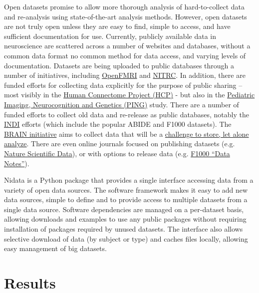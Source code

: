 \documentclass[twocolumn]{bmcart}%
\begin{document}
Open datasets promise to allow more thorough analysis of hard-to-collect
data and re-analysis using state-of-the-art analysis methods. However,
open datasets are not truly open unless they are easy to find, simple to
access, and have sufficient documentation for use. Currently, publicly
available data in neuroscience are scattered across a number of websites
and databases, without a common data format no common method for data
access, and varying levels of documentation. Datasets are being uploaded
to public databases through a number of initiatives, including
\href{http://www.openfmri.org/}{OpenFMRI} and
\href{http://www.nitrc.org}{NITRC}. In addition, there are funded
efforts for collecting data explicitly for the purpose of public sharing
-- most visibly in the \href{http://www.humanconnectome.org/}{Human
Connectome Project (HCP)} - but also in the
\href{http://pingstudy.ucsd.edu/}{Pediatric Imaging, Neurocognition and
Genetics (PING)} study. There are a number of funded efforts to collect
old data and re-release as public databases, notably the
\href{http://fcon_1000.projects.nitrc.org/indi/IndiRetro.html}{INDI}\cite{Mennes2013}
efforts (which include the popular ABIDE and F1000 datasets). The
\href{http://braininitiative.nih.gov/}{BRAIN initiative} aims to collect
data that will be a
\href{http://www.brainupdate.nih.gov/calling-all-statisticians/}{challenge
to store, let alone analyze}. There are even online journals focused on
publishing datasets (e.g. \href{http://www.nature.com/sdata/}{Nature
Scientific Data}), or with options to release data (e.g.
\href{http://f1000research.com/articles?tab=ALL\&articleTypes=DATA_NOTE\&subjectArea=396}{F1000
``Data Notes''}).

Nidata is a Python package that provides a single interface accessing
data from a variety of open data sources. The software framework makes
it easy to add new data sources, simple to define and to provide access
to multiple datasets from a single data source. Software dependencies
are managed on a per-dataset basis, allowing downloads and examples to
use any public packages without requiring installation of packages
required by unused datasets. The interface also allows selective
download of data (by subject or type) and caches files locally, allowing
easy management of big datasets.

\section{Results}\label{results}
\end{document}
